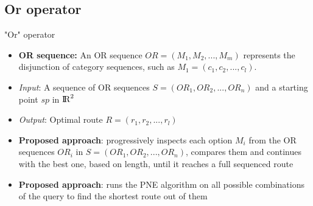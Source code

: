 \documentclass[18pt]{beamer}
\begin{document}
	
	\subsection{Or operator}
		\begin{frame}{"Or" operator}
		
			\begin{itemize}
				\item \textbf{OR sequence:} An OR sequence $OR = (M_1, M_2, ..., M_m)$ represents the disjunction of category sequences, such as $M_1 = (c_1, c_2, ..., c_l)$.\newline
				\item \textit{Input}: A sequence of OR sequences $S = (OR_1, OR_2, ..., OR_n)$ and a starting point $sp$ in ${\rm I\!R}^2$
				\item \textit{Output}: Optimal route $R = (r_1, r_2, ..., r_l)$ \newline
				\pause
				\item \textbf{Proposed approach}: progressively inspects each option $M_i$ from the OR sequences $OR_i$ in \newline $S = (OR_1, OR_2, ..., OR_n)$, compares them and continues with the best one, based on length, until it reaches a full sequenced route
				\item \textbf{Proposed approach}: runs the PNE algorithm on all possible combinations of the query to find the shortest route out of them
			\end{itemize}
		
		\end{frame}
	
	
\end{document}
